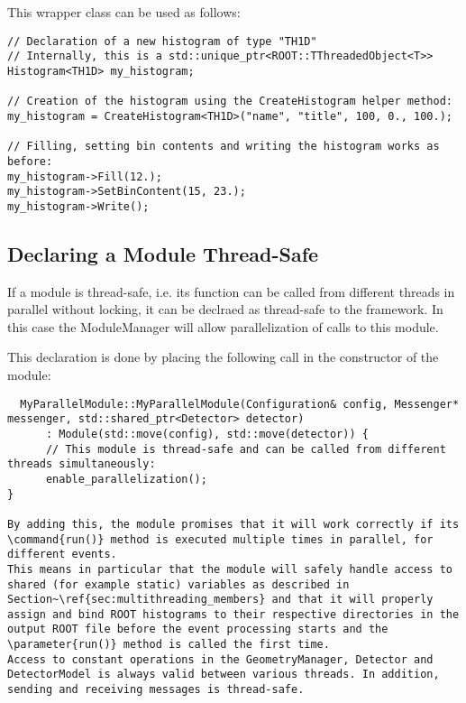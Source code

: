 This wrapper class can be used as follows:
\begin{verbatim}
// Declaration of a new histogram of type "TH1D"
// Internally, this is a std::unique_ptr<ROOT::TThreadedObject<T>>
Histogram<TH1D> my_histogram;

// Creation of the histogram using the CreateHistogram helper method:
my_histogram = CreateHistogram<TH1D>("name", "title", 100, 0., 100.);

// Filling, setting bin contents and writing the histogram works as before:
my_histogram->Fill(12.);
my_histogram->SetBinContent(15, 23.);
my_histogram->Write();
\end{verbatim}

\subsection{Declaring a Module Thread-Safe}

If a module is thread-safe, i.e. its  function can be called from different threads in parallel without locking, it can be declraed as thread-safe to the framework.
In this case the ModuleManager will allow parallelization of calls to this module.

This declaration is done by placing the following call in the constructor of the module:
\begin{verbatim}
  MyParallelModule::MyParallelModule(Configuration& config, Messenger* messenger, std::shared_ptr<Detector> detector)
      : Module(std::move(config), std::move(detector)) {
      // This module is thread-safe and can be called from different threads simultaneously:
      enable_parallelization();
}

By adding this, the module promises that it will work correctly if its \command{run()} method is executed multiple times in parallel, for different events.
This means in particular that the module will safely handle access to shared (for example static) variables as described in Section~\ref{sec:multithreading_members} and that it will properly assign and bind ROOT histograms to their respective directories in the output ROOT file before the event processing starts and the \parameter{run()} method is called the first time.
Access to constant operations in the GeometryManager, Detector and DetectorModel is always valid between various threads. In addition, sending and receiving messages is thread-safe.

\end{verbatim}

